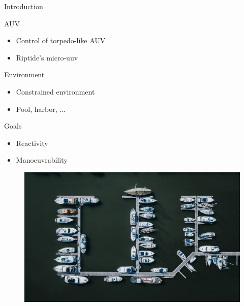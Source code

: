 \documentclass[10pt, xcolor={usenames, dvipsnames}]{beamer}
\begin{document}
        \begin{frame}{Introduction}
            \begin{minipage}[c]{0.55\textwidth}
                \begin{block}{AUV}
                    \vspace{0.25cm}
                    \begin{itemize}
                        \item Control of torpedo-like AUV \\ 
                        \item Riptide's micro-uuv
                    \end{itemize}
                \end{block}
                \begin{block}{Environment}
                    \begin{itemize}
                        \item Constrained environment \\ 
                        \item Pool, harbor, ...
                    \end{itemize}
                \end{block}
                \begin{block}{Goals}
                    \begin{itemize}
                        \item Reactivity \\
                        \item Manoeuvrability
                    \end{itemize}
                \end{block}
            \end{minipage}
            \hfill
            \begin{minipage}[c]{0.4\textwidth}
                \begin{figure}[htb]
                    \includegraphics[width=\textwidth]{imgs/harbour.png}


\end{figure}
\end{minipage}
\end{frame}
\end{document}

